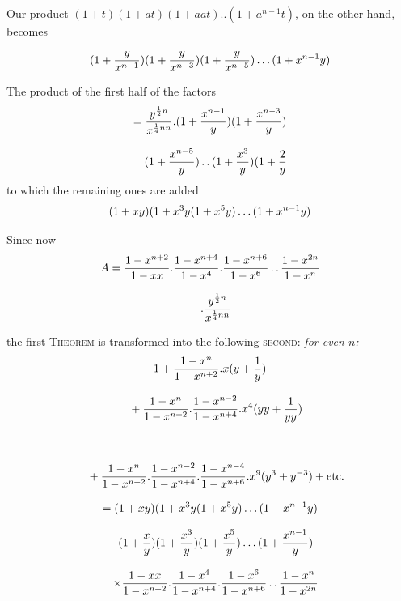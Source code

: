 Our product $(1+t)(1+at)(1+aat)..(1+a^{n-1}t)$, on the other hand, becomes




\[
(1+\frac{y}{x^{n-1}})(1+\frac{y}{x^{n-3}})(1+\frac{y}{x^{n-5}})\mathinner{.\,.\,.}(1+x^{n-1}y)
\]

The product of the first half of the factors
\[
\begin{gathered}=\frac{y^{\frac12n}}{x^{\frac14nn}}.(1+\frac{x^{n-1}}y)(1+\frac{x^{n-3}}y)\\[8pt]\quad{}(1+\frac{x^{n-5}}y)\mathinner{.\,.}(1+\frac{x^3}y)(1+\frac{2}{y}\end{gathered}
\]
to which the remaining ones are added
\[
(1+xy)(1+x^3y(1+x^5y)\mathinner{.\,.\,.}(1+x^{n-1}y)
\]

Since now
\[
\begin{gathered}A=\frac{1-x^{n+2}}{1-xx}.\frac{1-x^{n+4}}{1-x^4}.\frac{1-x^{n+6}}{1-x^6}\mathinner{.\,.}\frac{1-x^{2n}}{1-x^n}\\[8pt]\quad{}.\frac{y^{\frac12n}}{x^{\frac14nn}}\end{gathered}
\]

the first \textsc{Theorem} is transformed into the following \textsc{second}: \textit{for even $n$:}
\[
\begin{gathered}
1+\frac{1-x^n}{1-x^{n+2}}.x(y+\frac1y)
\\[8pt]\quad{}+\frac{1-x^n}{1-x^{n+2}}.\frac{1-x^{n-2}}{1-x^{n+4}}.x^4(yy+\frac1{yy})\\[8pt]
\quad\\[8pt]\quad{}+\frac{1-x^n}{1-x^{n+2}}.\frac{1-x^{n-2}}{1-x^{n+4}}.\frac{1-x^{n-4}}{1-x^{n+6}}.x^9(y^3+y^{-3})+\text{etc.}\\[8pt]
=(1+xy)(1+x^3y(1+x^5y)\mathinner{.\,.\,.}(1+x^{n-1}y)
\\[8pt]\quad{}(1+\frac xy)(1+\frac{x^3}y)(1+\frac{x^5}y)\mathinner{.\,.\,.}(1+\frac{x^{n-1}}y)\\[8pt]
\quad\times\frac{1-xx}{1-x^{n+2}}.\frac{1-x^4}{1-x^{n+4}}.\frac{1-x^6}{1-x^{n+6}}\mathinner{.\,.}\frac{1-x^n}{1-x^{2n}}
\end{gathered}
\]

